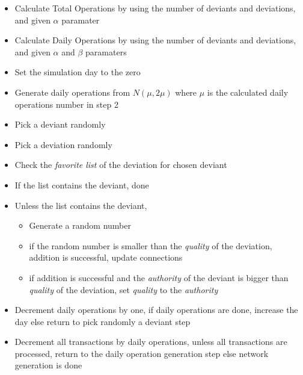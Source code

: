\documentclass[12pt,a4paper]{report}
\begin{document}
\begin{itemize}

\item Calculate Total Operations by using the number of deviants and deviations, and given $\alpha$ paramater

\item Calculate Daily Operations by using the number of deviants and deviations, and given $\alpha$ and $\beta$ paramaters

\item Set the simulation day to the zero

\item Generate daily operations from $N(\mu, 2\mu)$ where $\mu$ is the calculated daily operations number in step 2

\item Pick a deviant randomly

\item Pick a deviation randomly

\item Check the \emph{favorite list} of the deviation for chosen deviant

\item If the list contains the deviant, done

\item Unless the list contains the deviant,
	
	\begin{itemize}

		\item Generate a random number	

		\item if the random number is smaller than the \emph{quality} of the deviation, addition is successful, update connections

		\item  if addition is successful and the \emph{authority} of the deviant is bigger than \emph{quality} of the deviation, set \emph{quality} to the \emph{authority}

	\end{itemize}

\item Decrement daily operations by one, if daily operations are done, increase the day else return to pick randomly a deviant step

\item Decrement all transactions by daily operations, unless all transactions are processed, return to the daily operation generation step else network generation is done

\end{itemize}	
\end{document}
